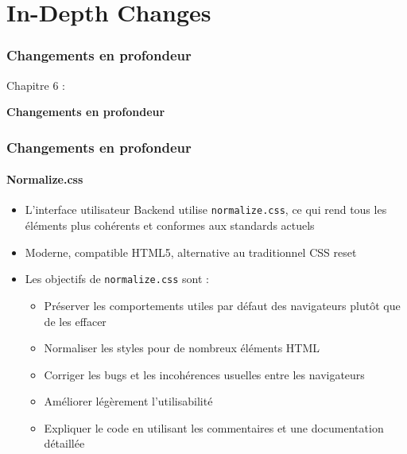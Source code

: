 %

\section{In-Depth Changes}
\begin{frame}[fragile]
	\frametitle{Changements en profondeur}

	\begin{center}\huge{Chapitre 6 :}\end{center}
	\begin{center}\huge{\color{typo3darkgrey}\textbf{Changements en profondeur}}\end{center}

\end{frame}


\begin{frame}[fragile]
	\frametitle{Changements en profondeur}
	\framesubtitle{Normalize.css}

	\begin{itemize}
		\item L'interface utilisateur Backend utilise \texttt{normalize.css}, ce qui rend tous les éléments plus cohérents et conformes aux standards actuels
		\item Moderne, compatible HTML5, alternative au traditionnel \textsf{CSS reset}
		\item Les objectifs de \texttt{normalize.css} sont :

			\begin{itemize}
				\item Préserver les comportements utiles par défaut des navigateurs plutôt que de les effacer
				\item Normaliser les styles pour de nombreux éléments HTML
				\item Corriger les bugs et les incohérences usuelles entre les navigateurs
				\item Améliorer légèrement l'utilisabilité
				\item Expliquer le code en utilisant les commentaires et une documentation détaillée
			\end{itemize}

	\end{itemize}

\end{frame}

